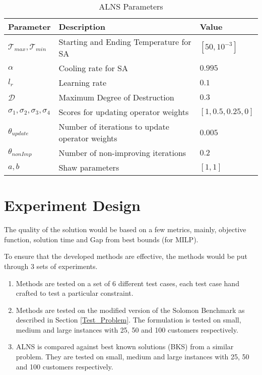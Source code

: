 \begin{table}[h]
    \centering
    \begin{tabular}{lll} 
        \toprule
        \textbf{Parameter} & \textbf{Description} &\textbf{Value}\\ 
        \midrule
        $\mathcal{T}_{max}, \mathcal{T}_{min}$ & Starting and Ending Temperature for SA & $[50,10^{-3}]$\\ 
        
        $\alpha$ & Cooling rate for SA & $0.995$\\ 
         
        $l_{r}$ & Learning rate & $0.1$ \\ 
                             
       	$\mathcal{D}$ & Maximum Degree of Destruction & $0.3$\\ 
		
		$\sigma_1,\sigma_2,\sigma_3,\sigma_4 $ & Scores for updating operator weights 
				& $[1,0.5,0.25,0]$\\
		
		$\theta_{update}$ & Number of iterations to update operator weights & $0.005$	 \\
		
		$\theta_{nonImp}$ & Number of non-improving iterations & $0.2$\\
				
		$a,b$ & Shaw parameters & $[1,1]$\\
        \bottomrule
    \end{tabular}
    \caption{ALNS Parameters}
    \label{tab:ALNS_parameters}
\end{table}

\section{Experiment Design}
The quality of the solution would be based on a few metrics, mainly, objective function, solution time and Gap from best bounds (for MILP).

To ensure that the developed methods are effective, the methods would be put through 3 sets of experiments.
\begin{enumerate}
\item Methods are tested on a set of 6 different test cases, each test case hand crafted to test a particular constraint.
\item Methods are tested on the modified version of the Solomon Benchmark as described in Section \ref{Test_Problem}. The formulation is tested on small, medium and large instances with 25, 50 and 100 customers respectively.
\item ALNS is compared against best known solutions (BKS) from a similar problem. They are tested on small, medium and large instances with 25, 50 and 100 customers respectively.
\end{enumerate}

